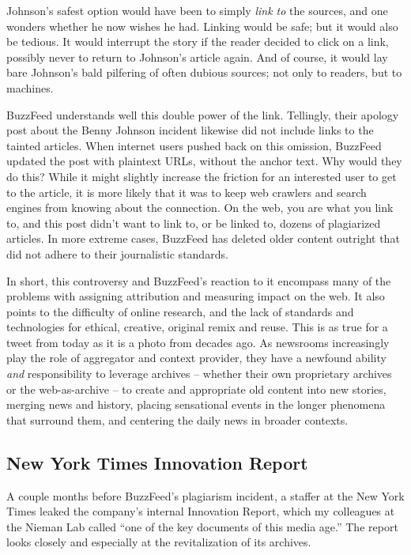 Johnson's safest option would have been to simply \emph{link to} the sources, and one wonders whether he now wishes he had. Linking would be safe; but it would also be tedious. It would interrupt the story if the reader decided to click on a link, possibly never to return to Johnson's article again. And of course, it would lay bare Johnson's bald pilfering of often dubious sources; not only to readers, but to machines.

BuzzFeed understands well this double power of the link. Tellingly, their apology post about the Benny Johnson incident likewise did not include links to the tainted articles. When internet users pushed back on this omission, BuzzFeed updated the post with plaintext URLs, without the anchor text. Why would they do this? While it might slightly increase the friction for an interested user to get to the article, it is more likely that it was to keep web crawlers and search engines from knowing about the connection. On the web, you are what you link to, and this post didn't want to link to, or be linked to, dozens of plagiarized articles. In more extreme cases, BuzzFeed has deleted older content outright that did not adhere to their journalistic standards.

In short, this controversy and BuzzFeed's reaction to it encompass many of the problems with assigning attribution and measuring impact on the web. It also points to the difficulty of online research, and the lack of standards and technologies for ethical, creative, original remix and reuse. This is as true for a tweet from today as it is a photo from decades ago. As newsrooms increasingly play the role of aggregator and context provider, they have a newfound ability \emph{and} responsibility to leverage archives -- whether their own proprietary archives or the web-as-archive -- to create and appropriate old content into new stories, merging news and history, placing sensational events in the longer phenomena that surround them, and centering the daily news in broader contexts.

\subsection{New York Times Innovation Report}

A couple months before BuzzFeed's plagiarism incident, a staffer at the New York Times leaked the company's internal Innovation Report, which my colleagues at the Nieman Lab called ``one of the key documents of this media age.'' The report looks closely and especially at the revitalization of its archives.

